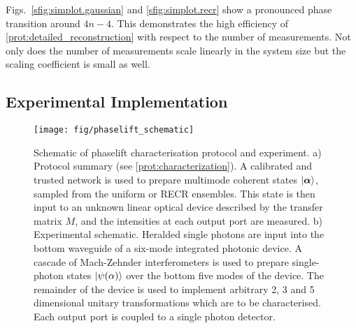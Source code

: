 Figs.~\ref{sfig:simplot.gaussian} and \ref{sfig:simplot.recr} show a pronounced phase transition around $4n - 4$.
This demonstrates the high efficiency of \cref{prot:detailed_reconstruction} with respect to the number of measurements.
Not only does the number of measurements scale linearly in the system size but the scaling coefficient is small as well.



\subsection{Experimental Implementation}

\begin{figure*}[tbp]
  \centering
  \texttt{[image: fig/phaselift\_schematic]}%
  \caption{%
    Schematic of phaselift characterisation protocol and experiment.
     a) Protocol summary (see \cref{prot:characterization}).
     A calibrated and trusted network is used to prepare multimode coherent states ${|{\boldsymbol{\alpha}}\rangle}$, sampled from the uniform or RECR ensembles.
     This state is then input to an unknown linear optical device described by the transfer matrix $ M$, and the intensities at each output port are measured.
     b) Experimental schematic.
     Heralded single photons are input into the bottom waveguide of a six-mode integrated photonic device.
     A cascade of Mach-Zehnder interferometers is used to prepare single-photon states ${|{\psi( \alpha)}\rangle}$ over the bottom five modes of the device.
     The remainder of the device is used to implement arbitrary 2, 3 and 5 dimensional unitary transformations which are to be characterised.
     Each output port is coupled to a single photon detector.
   }
  \label{fig:experimental.schematic}
\end{figure*}


